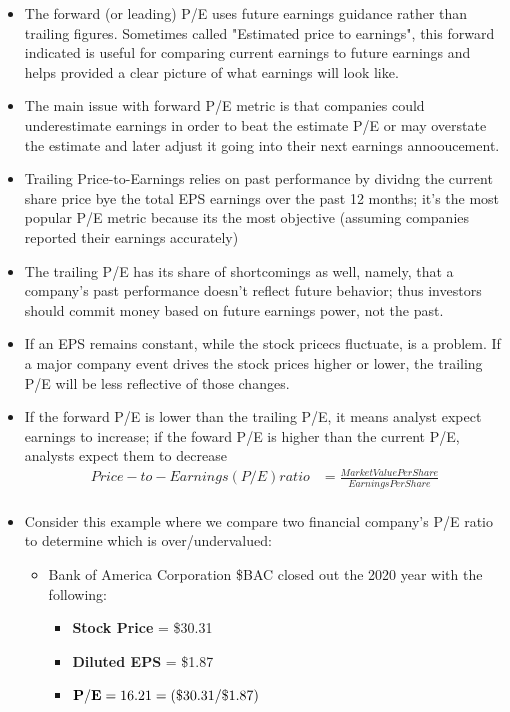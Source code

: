 \documentclass{article}
\begin{document}
\begin{itemize}
\begin{itemize}
				\item The forward (or leading) P/E uses future earnings guidance rather than trailing figures. Sometimes called "Estimated price to earnings", this
					forward indicated is useful for comparing current earnings to future earnings and helps provided a clear picture of what earnings will look like.
				\item The main issue with forward P/E metric is that companies could underestimate earnings in order to beat the estimate P/E or may overstate the estimate and later adjust it going into their next earnings annooucement.
				\item Trailing Price-to-Earnings relies on past performance by dividng the current share price bye the total EPS earnings over the past 12 months; it's the most popular P/E metric because its the most objective (assuming companies reported their earnings accurately)
				\item The trailing P/E has its share of shortcomings as well, namely, that a company's past performance doesn't reflect future behavior; thus investors should commit money based on future earnings power, not the past.
				\item If an EPS remains constant, while the stock pricecs fluctuate, is a problem. If a major company event drives the stock prices higher or lower, the trailing P/E will be less reflective of those changes.
				\item If the forward P/E is lower than the trailing P/E, it means analyst expect earnings to increase; if the foward P/E is higher than the current P/E, analysts expect them to decrease
				\begin{align*}
					Price-to-Earnings (P/E) ratio &= \frac{Market Value Per Share}{Earnings Per Share}\\
				\end{align*}
				\item Consider this example where we compare two financial company's P/E ratio to determine which is over/undervalued:
					\begin{itemize}
						\item Bank of America Corporation \$BAC closed out the 2020 year with the following:
							\begin{itemize}
								\item {\bf Stock Price} = \$30.31
								\item {\bf Diluted EPS} = \$1.87
								\item ${\bf P/E} = 16.21 = (\$30.31/\$1.87)$
							\end{itemize}

\end{itemize}
\end{itemize}
\end{itemize}
\end{document}
